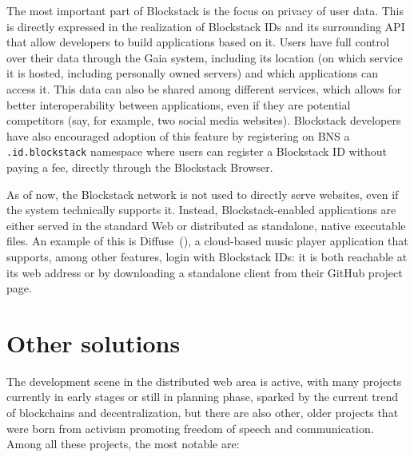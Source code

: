 \documentclass[mscthesis]{usiinfthesis}
\begin{document}
The most important part of Blockstack is the focus on privacy of user data. This is directly expressed in the realization of Blockstack IDs and its surrounding API that allow developers to build applications based on it. Users have full control over their data through the Gaia system, including its location (on which service it is hosted, including personally owned servers) and which applications can access it. This data can also be shared among different services, which allows for better interoperability between applications, even if they are potential competitors (say, for example, two social media websites). Blockstack developers have also encouraged adoption of this feature by registering on BNS a \texttt{.id.blockstack} namespace where users can register a Blockstack ID without paying a fee, directly through the Blockstack Browser.

As of now, the Blockstack network is not used to directly serve websites, even if the system technically supports it. Instead, Blockstack-enabled applications are either served in the standard Web or distributed as standalone, native executable files.
An example of this is Diffuse~(\cite{website:diffuse}), a cloud-based music player application that supports, among other features, login with Blockstack IDs: it is both reachable at its web address or by downloading a standalone client from their GitHub project page.

\section{Other solutions}\label{sec:browserprojects}

The development scene in the distributed web area is active, with many projects currently in early stages or still in planning phase, sparked by the current trend of blockchains and decentralization, but there are also other, older projects that were born from activism promoting freedom of speech and communication. Among all these projects, the most notable are:
\end{document}

